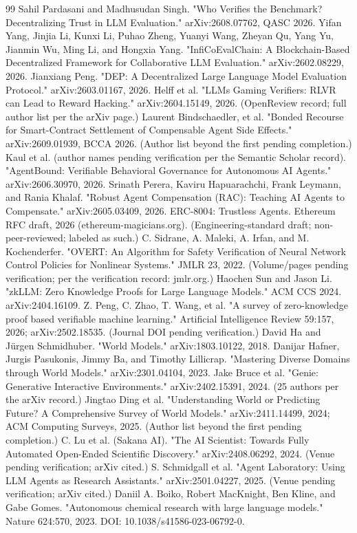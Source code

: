 \documentclass[11pt,a4paper]{article}
\begin{document}
\begin{thebibliography}{99}
 Sahil Pardasani and Madhusudan Singh. "Who Verifies the Benchmark? Decentralizing Trust in LLM Evaluation." arXiv:2608.07762, QASC 2026.
 Yifan Yang, Jinjia Li, Kunxi Li, Puhao Zheng, Yuanyi Wang, Zheyan Qu, Yang Yu, Jianmin Wu, Ming Li, and Hongxia Yang. "InfiCoEvalChain: A Blockchain-Based Decentralized Framework for Collaborative LLM Evaluation." arXiv:2602.08229, 2026.
 Jianxiang Peng. "DEP: A Decentralized Large Language Model Evaluation Protocol." arXiv:2603.01167, 2026.
 Helff et al. "LLMs Gaming Verifiers: RLVR can Lead to Reward Hacking." arXiv:2604.15149, 2026. (OpenReview record; full author list per the arXiv page.)
 Laurent Bindschaedler, et al. "Bonded Recourse for Smart-Contract Settlement of Compensable Agent Side Effects." arXiv:2609.01939, BCCA 2026. (Author list beyond the first pending completion.)
 Kaul et al. (author names pending verification per the Semantic Scholar record). "AgentBound: Verifiable Behavioral Governance for Autonomous AI Agents." arXiv:2606.30970, 2026.
 Srinath Perera, Kaviru Hapuarachchi, Frank Leymann, and Rania Khalaf. "Robust Agent Compensation (RAC): Teaching AI Agents to Compensate." arXiv:2605.03409, 2026.
 ERC-8004: Trustless Agents. Ethereum RFC draft, 2026 (ethereum-magicians.org). (Engineering-standard draft; non-peer-reviewed; labeled as such.)
 C. Sidrane, A. Maleki, A. Irfan, and M. Kochenderfer. "OVERT: An Algorithm for Safety Verification of Neural Network Control Policies for Nonlinear Systems." JMLR 23, 2022. (Volume/pages pending verification; per the verification record: jmlr.org.)
 Haochen Sun and Jason Li. "zkLLM: Zero Knowledge Proofs for Large Language Models." ACM CCS 2024. arXiv:2404.16109.
 Z. Peng, C. Zhao, T. Wang, et al. "A survey of zero-knowledge proof based verifiable machine learning." Artificial Intelligence Review 59:157, 2026; arXiv:2502.18535. (Journal DOI pending verification.)
 David Ha and Jürgen Schmidhuber. "World Models." arXiv:1803.10122, 2018.
 Danijar Hafner, Jurgis Pasukonis, Jimmy Ba, and Timothy Lillicrap. "Mastering Diverse Domains through World Models." arXiv:2301.04104, 2023.
 Jake Bruce et al. "Genie: Generative Interactive Environments." arXiv:2402.15391, 2024. (25 authors per the arXiv record.)
 Jingtao Ding et al. "Understanding World or Predicting Future? A Comprehensive Survey of World Models." arXiv:2411.14499, 2024; ACM Computing Surveys, 2025. (Author list beyond the first pending completion.)
 C. Lu et al. (Sakana AI). "The AI Scientist: Towards Fully Automated Open-Ended Scientific Discovery." arXiv:2408.06292, 2024. (Venue pending verification; arXiv cited.)
 S. Schmidgall et al. "Agent Laboratory: Using LLM Agents as Research Assistants." arXiv:2501.04227, 2025. (Venue pending verification; arXiv cited.)
 Daniil A. Boiko, Robert MacKnight, Ben Kline, and Gabe Gomes. "Autonomous chemical research with large language models." Nature 624:570, 2023. DOI: 10.1038/s41586-023-06792-0.
\end{thebibliography}
\end{document}
